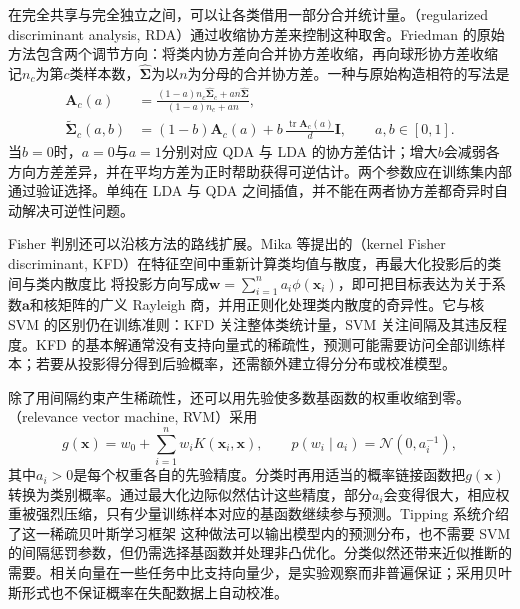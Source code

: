 在完全共享与完全独立之间，可以让各类借用一部分合并统计量。（regularized discriminant analysis, RDA）通过收缩协方差来控制这种取舍。Friedman 的原始方法包含两个调节方向：将类内协方差向合并协方差收缩，再向球形协方差收缩
记$n_c$为第$c$类样本数，$\hat{\bm{\Sigma}}$为以$n$为分母的合并协方差。一种与原始构造相符的写法是
\begin{equation}
  \begin{aligned}
    \bm{A}_c(a)
      &=\frac{(1-a)n_c\hat{\bm{\Sigma}}_c+an\hat{\bm{\Sigma}}}
              {(1-a)n_c+an},\\
    \tilde{\bm{\Sigma}}_c(a,b)
      &=(1-b)\bm{A}_c(a)
        +b\,\frac{\operatorname{tr}\bm{A}_c(a)}{d}\bm{I},
        \qquad a,b\in[0,1].
  \end{aligned}
  \label{eq:classification-rda}
\end{equation}
当$b=0$时，$a=0$与$a=1$分别对应 QDA 与 LDA 的协方差估计；增大$b$会减弱各方向方差差异，并在平均方差为正时帮助获得可逆估计。两个参数应在训练集内部通过验证选择。单纯在 LDA 与 QDA 之间插值，并不能在两者协方差都奇异时自动解决可逆性问题。

Fisher 判别还可以沿核方法的路线扩展。Mika 等提出的（kernel Fisher discriminant, KFD）在特征空间中重新计算类均值与散度，再最大化投影后的类间与类内散度比
将投影方向写成$\bm{w}=\sum_{i=1}^n a_i\phi(\bm{x}_i)$，即可把目标表达为关于系数$\bm{a}$和核矩阵的广义 Rayleigh 商，并用正则化处理类内散度的奇异性。它与核 SVM 的区别仍在训练准则：KFD 关注整体类统计量，SVM 关注间隔及其违反程度。KFD 的基本解通常没有支持向量式的稀疏性，预测可能需要访问全部训练样本；若要从投影得分得到后验概率，还需额外建立得分分布或校准模型。

除了用间隔约束产生稀疏性，还可以用先验使多数基函数的权重收缩到零。（relevance vector machine, RVM）采用
\[
  g(\bm{x})=w_0+\sum_{i=1}^n w_i K(\bm{x}_i,\bm{x}),
  \qquad
  p(w_i\mid a_i)=\mathcal{N}(0,a_i^{-1}),
\]
其中$a_i>0$是每个权重各自的先验精度。分类时再用适当的概率链接函数把$g(\bm{x})$转换为类别概率。通过最大化边际似然估计这些精度，部分$a_i$会变得很大，相应权重被强烈压缩，只有少量训练样本对应的基函数继续参与预测。Tipping 系统介绍了这一稀疏贝叶斯学习框架
这种做法可以输出模型内的预测分布，也不需要 SVM 的间隔惩罚参数，但仍需选择基函数并处理非凸优化。分类似然还带来近似推断的需要。相关向量在一些任务中比支持向量少，是实验观察而非普遍保证；采用贝叶斯形式也不保证概率在失配数据上自动校准。

